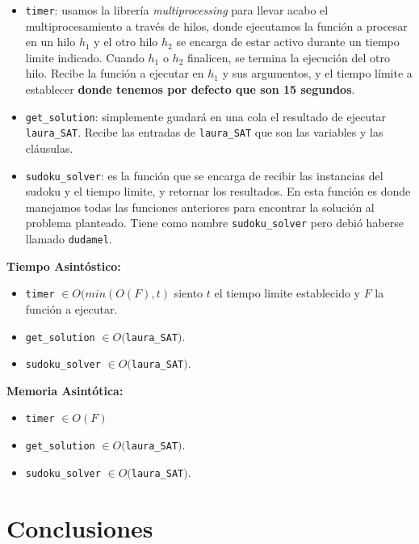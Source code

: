 \documentclass[letterpaper,12pt]{article}
\begin{document}
\begin{itemize}
	\item \texttt{timer}: usamos la librería \textit{multiprocessing} para llevar acabo el multiprocesamiento a través de hilos, donde ejecutamos la función a procesar en un hilo $h_1$ y el otro hilo $h_2$ se encarga de estar activo durante un tiempo limite indicado. Cuando $h_1$ o $h_2$ finalicen, se termina la ejecuci\'on del otro hilo. Recibe la función a ejecutar en $h_1$ y sus argumentos, y el tiempo límite a establecer \textbf{donde tenemos por defecto que son 15 segundos}.

	\item \texttt{get\_solution}: simplemente guadará en una cola el resultado de ejecutar \texttt{laura\_SAT}. Recibe las entradas de \texttt{laura\_SAT} que son las variables y las cláusulas.

	\item \texttt{sudoku\_solver}: es la función que se encarga de recibir las instancias del sudoku y el tiempo limite, y retornar los resultados. En esta función es donde manejamos todas las funciones anteriores para encontrar la solución al problema planteado. Tiene como nombre \texttt{sudoku\_solver} pero debió haberse llamado \texttt{dudamel}. \\
\end{itemize}

\textbf{Tiempo Asintóstico:}
\begin{itemize}
	\item \texttt{timer} $\in O(min(O(F), t)$ siento $t$ el tiempo limite establecido y $F$ la funci\'on a ejecutar.
	\item \texttt{get\_solution} $\in O($\texttt{laura\_SAT}$)$.	
	\item \texttt{sudoku\_solver} $\in O($\texttt{laura\_SAT}$)$. \\
\end{itemize}

\textbf{Memoria Asintótica:}
\begin{itemize}
	\item \texttt{timer} $\in O(F)$
	\item \texttt{get\_solution} $\in O($\texttt{laura\_SAT}$)$.
	\item \texttt{sudoku\_solver} $\in O($\texttt{laura\_SAT}$)$.
\end{itemize}


\section{Conclusiones}
\end{document}
